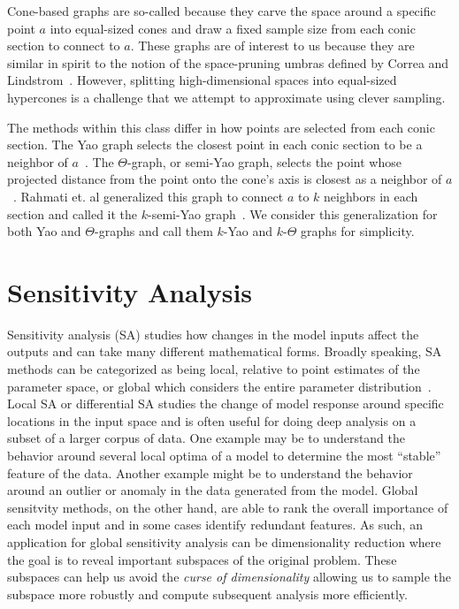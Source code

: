 Cone-based graphs are so-called because they carve the space around a specific point $a$ into equal-sized cones and draw a fixed sample size from each conic section to connect to $a$.
%
These graphs are of interest to us because they are similar in spirit to the notion of the space-pruning umbras defined by Correa and Lindstrom~\cite{CorreaLindstrom2011}.
%
However, splitting high-dimensional spaces into equal-sized hypercones is a challenge that we attempt to approximate using clever sampling.

The methods within this class differ in how points are selected from each conic section.
%
The Yao graph selects the closest point in each conic section to be a neighbor of $a$~\cite{Yao1982}.
%
The $\Theta$-graph, or semi-Yao graph, selects the point whose projected distance from the point onto the cone's axis is closest as a neighbor of $a$~\cite{Clarkson1987,Keil1988}.
%
Rahmati et. al generalized this graph to connect $a$ to $k$ neighbors in each section and called it the $k$-semi-Yao graph~\cite{RahmatiKingWhitesides2013}.
%
We consider this generalization for both Yao and $\Theta$-graphs and call them $k$-Yao and $k$-$\Theta$ graphs for simplicity.

\section{Sensitivity Analysis}
\label{sec:sensitivity}

Sensitivity analysis (SA) studies how changes in the model inputs affect the outputs and can take many different mathematical forms.
%
Broadly speaking, SA methods can be categorized as being local, relative to point estimates of the parameter space, or global which considers the entire parameter distribution~\cite{Hamby1995}.
%
Local SA or differential SA studies the change of model response around specific locations in the input space and is often useful for doing deep analysis on a subset of a larger corpus of data.
%
One example may be to understand the behavior around several local optima of a model to determine the most ``stable'' feature of the data.
%
Another example might be to understand the behavior around an outlier or anomaly in the data generated from the model.
%
Global sensitvity methods, on the other hand, are able to rank the overall importance of each model input and in some cases identify redundant features.
%
As such, an application for global sensitivity analysis can be dimensionality reduction where the goal is to reveal important subspaces of the original problem.
%
These subspaces can help us avoid the \emph{curse of dimensionality} allowing us to sample the subspace more robustly and compute subsequent analysis more efficiently.

